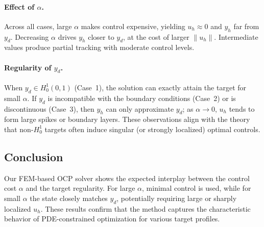 \documentclass[a4paper,10pt]{article}
\begin{document}
\paragraph{Effect of $\alpha$.}
Across all cases, large $\alpha$ makes control expensive, yielding $u_h\approx0$ and $y_h$ far from $y_d$. Decreasing $\alpha$ drives $y_h$ closer to $y_d$, at the cost of larger $\|u_h\|$. Intermediate values produce partial tracking with moderate control levels.

\paragraph{Regularity of $y_d$.}
When $y_d\in H^1_0(0,1)$ (Case~1), the solution can exactly attain the target for small $\alpha$. If $y_d$ is incompatible with the boundary conditions (Case~2) or is discontinuous (Case~3), then $y_h$ can only approximate $y_d$; as $\alpha\to0$, $u_h$ tends to form large spikes or boundary layers. These observations align with the theory that non-$H^1_0$ targets often induce singular (or strongly localized) optimal controls.

\subsection{Conclusion}
Our FEM-based OCP solver shows the expected interplay between the control cost $\alpha$ and the target regularity. For large $\alpha$, minimal control is used, while for small $\alpha$ the state closely matches $y_d$, potentially requiring large or sharply localized $u_h$. These results confirm that the method captures the characteristic behavior of PDE-constrained optimization for various target profiles.

\printbibliography
\end{document}
